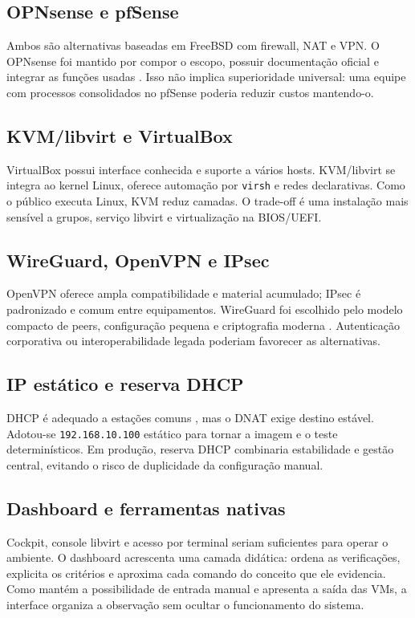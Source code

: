 \documentclass[12pt,a4paper]{article}
\newcommand{\ip}[1]{\texttt{#1}}
\begin{document}
\subsection{OPNsense e pfSense}
Ambos são alternativas baseadas em FreeBSD com firewall, NAT e VPN. O OPNsense
foi mantido por compor o escopo, possuir documentação oficial e integrar as
funções usadas \citep{opnsensedocs}. Isso não implica superioridade universal:
uma equipe com processos consolidados no pfSense poderia reduzir custos mantendo-o.

\subsection{KVM/libvirt e VirtualBox}
VirtualBox possui interface conhecida e suporte a vários hosts. KVM/libvirt se
integra ao kernel Linux, oferece automação por \texttt{virsh} e redes declarativas.
Como o público executa Linux, KVM reduz camadas. O trade-off é uma instalação
mais sensível a grupos, serviço libvirt e virtualização na BIOS/UEFI.

\subsection{WireGuard, OpenVPN e IPsec}
OpenVPN oferece ampla compatibilidade e material acumulado; IPsec é padronizado
e comum entre equipamentos. WireGuard foi escolhido pelo modelo compacto de
peers, configuração pequena e criptografia moderna \citep{donenfeld2017}.
Autenticação corporativa ou interoperabilidade legada poderiam favorecer as
alternativas.

\subsection{IP estático e reserva DHCP}
DHCP é adequado a estações comuns \citep{rfc2131}, mas o DNAT exige destino
estável. Adotou-se \ip{192.168.10.100} estático para tornar a imagem e o teste
determinísticos. Em produção, reserva DHCP combinaria estabilidade e gestão
central, evitando o risco de duplicidade da configuração manual.

\subsection{Dashboard e ferramentas nativas}
Cockpit, console libvirt e acesso por terminal seriam suficientes para operar o
ambiente. O dashboard acrescenta uma camada didática: ordena as verificações,
explicita os critérios e aproxima cada comando do conceito que ele evidencia.
Como mantém a possibilidade de entrada manual e apresenta a saída das VMs, a
interface organiza a observação sem ocultar o funcionamento do sistema.
\end{document}
